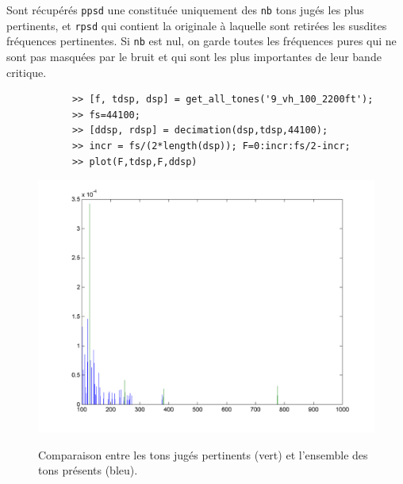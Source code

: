     \newpage
    Sont r{\'e}cup{\'e}r{\'e}s {\tt ppsd} une \dsp constitu{\'e}e uniquement des {\tt nb}
    tons jug{\'e}s les plus pertinents, et {\tt rpsd} qui contient
    la \dsp originale {\`a} laquelle sont retir{\'e}es les susdites fr{\'e}quences pertinentes.
    Si {\tt nb} est nul, on garde toutes les fr{\'e}quences pures qui ne sont pas masqu{\'e}es
    par le bruit et qui sont les plus importantes de leur bande critique.

    \medskip
    \begin{figure}[h]
      \centering
      \begin{verbatim}
      >> [f, tdsp, dsp] = get_all_tones('9_vh_100_2200ft');
      >> fs=44100;
      >> [ddsp, rdsp] = decimation(dsp,tdsp,44100);
      >> incr = fs/(2*length(dsp)); F=0:incr:fs/2-incr;
      >> plot(F,tdsp,F,ddsp)
      \end{verbatim}
      \includegraphics[width=12cm]{figures/decimation.png}\\
      \caption{Comparaison entre les tons jug{\'e}s pertinents (vert) et l'ensemble des tons pr{\'e}sents (bleu).}
      \label{figdecimation}
    \end{figure}


    \newpage
